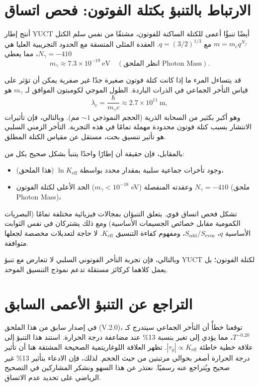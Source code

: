 \documentclass[12pt,a4paper]{article}
\newcommand{\Keff}{K_{\mathrm{eff}}}
\begin{document}
	\section{الارتباط بالتنبؤ بكتلة الفوتون: فحص اتساق}
	\label{sec:photon_mass_consistency}
	
	أنتج إطار YUCT أيضًا تنبؤًا أعمى للكتلة الساكنة للفوتون، مشتقًا من نفس سلم الكتل \(m = m_e q^{N_f}\) مع \(q=(3/2)^{1/3}\). العقدة المثلى المتسقة مع الحدود التجريبية العليا هي \(N_\gamma = -410\)، مما يعطي
	\[
	m_\gamma \approx 7.3 \times 10^{-19}~\text{eV} \quad (\text{انظر الملحق Photon Mass}).
	\]
	
	قد يتساءل المرء ما إذا كانت كتلة فوتون صغيرة جدًا غير صفرية يمكن أن تؤثر على قياس التأخر الجماعي في الذرات الباردة. الطول الموجي لكومبتون الموافق لـ \(m_\gamma\) هو
	\[
	\lambda_c = \frac{\hbar}{m_\gamma c} \approx 2.7\times10^{11}~\text{m},
	\]
	وهو أكبر بكثير من السحابة الذرية (الحجم النموذجي \(\sim 1\) مم). وبالتالي، فإن تأثيرات الانتشار بسبب كتلة فوتون محدودة مهملة تمامًا في هذه التجربة. التأخر الزمني السلبي هو تأثير تنسيق بحت، مستقل عن مقياس الكتلة المطلق.
	
	بالمقابل، فإن حقيقة أن إطارًا واحدًا يتنبأ بشكل صحيح بكل من:
	\begin{itemize}
		\item وجود تأخرات جماعية سلبية بمقدار محدد بواسطة \(\ln\Keff\) (هذا الملحق)،
		\item الحد الأعلى لكتلة الفوتون (\(m_\gamma < 10^{-18}\) eV) وعقدته المنفصلة \(N_\gamma = -410\) (ملحق Photon Mass)،
	\end{itemize}
	تشكل فحص اتساق قوي. يتعلق التنبؤان بمجالات فيزيائية مختلفة تمامًا (البصريات الكمومية مقابل خصائص الجسيمات الأساسية) ومع ذلك يشتركان في نفس الثوابت الأساسية \(q\)، \(S_{\mathrm{odd}}/S_{\mathrm{even}}\)، ومفهوم كفاءة التنسيق \(\Keff\). لا حاجة لتعديلات مخصصة لجعلها متوافقة.
	
	وبالتالي، فإن تجربة التأخر الفوتوني السلبي لا تتعارض مع تنبؤ YUCT لكتلة الفوتون؛ بل يعمل كلاهما كركائز مستقلة تدعم نموذج التنسيق الموحد.
	
	\section{التراجع عن التنبؤ الأعمى السابق}
	
	في إصدار سابق من هذا الملحق (V.2.0)، توقعنا خطأً أن التأخر الجماعي سيتدرج كـ \(T^{-0.20}\)، مما يؤدي إلى تغير بنسبة 13\% عند مضاعفة درجة الحرارة. استند هذا التنبؤ إلى علاقة خطية خاطئة \(|\tau_g| \propto \Keff\). تظهر العلاقة اللوغاريتمية الصحيحة المشتقة هنا أن تأثير درجة الحرارة أصغر بحوالي مرتبتين من حيث الحجم. لذلك، فإن الادعاء بتأثير 13\% غير صحيح ويُتراجع عنه رسميًا. نعتذر عن هذا السهو ونشكر المشاركين في التصحيح الرياضي على تحديد عدم الاتساق.
	
\end{document}
